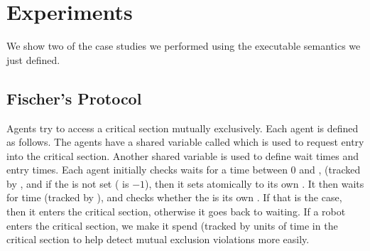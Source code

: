 \section{Experiments}
We show two of the case studies we performed using the executable semantics we just defined. 
\subsection{Fischer's Protocol}
Agents try to access a critical section mutually exclusively. Each agent is defined as follows. The agents have a shared variable called  which is used to request entry into the critical section. Another shared variable  is used to define wait times and entry times. Each agent initially checks waits for a time between 0 and , (tracked by , and if the  is not set ( is $-1$), then it sets  atomically to its own . It then waits for  time (tracked by ), and checks whether the  is its own . If that is the case, then it enters the critical section, otherwise it goes back to waiting. If a robot enters the critical section, we make it spend (tracked by  units of time in the critical section to help detect mutual exclusion violations more easily.

